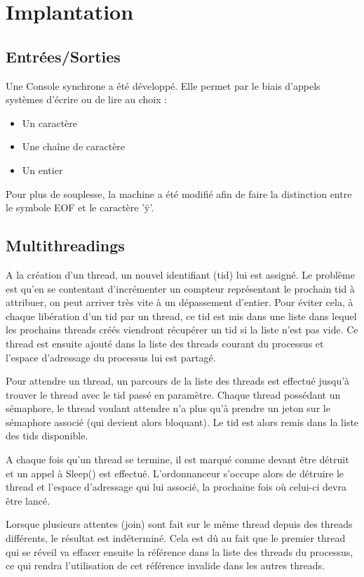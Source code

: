 \documentclass{report}
\begin{document}
\chapter{Implantation}
\section{Entrées/Sorties}
Une Console synchrone a été développé. Elle permet par le biais d'appels systèmes d'écrire ou de lire au choix : 

\begin{itemize}
\item Un caractère
\item Une chaîne de caractère
\item Un entier
\end{itemize}

Pour plus de souplesse, la machine a été modifié afin de faire la distinction entre le symbole EOF et le caractère 'ÿ'.

\section{Multithreadings}
A la création d'un thread, un nouvel identifiant (tid) lui est assigné. Le problème est qu'en se contentant d'incrémenter un compteur représentant le prochain tid à attribuer, on peut arriver très vite à un dépassement d'entier. Pour éviter cela, à chaque libération d'un tid par un thread, ce tid est mis dans une liste dans lequel les prochains threads créés viendront récupérer un tid si la liste n'est pas vide.
Ce thread est ensuite ajouté dans la liste des threads courant du processus et l'espace d'adressage du processus lui est partagé.

Pour attendre un thread, un parcours de la liste des threads est effectué jusqu'à trouver le thread avec le tid passé en paramètre. Chaque thread possédant un sémaphore, le thread voulant attendre n'a plus qu'à prendre un jeton sur le sémaphore associé (qui devient alors bloquant). Le tid est alors remis dans la liste des tids disponible.

A chaque fois qu'un thread se termine, il est marqué comme devant être détruit et un appel à Sleep() est effectué.
L'ordonnanceur s'occupe alors de détruire le thread et l'espace d'adressage qui lui associé, la prochaine fois où celui-ci devra être lancé.

Lorsque plusieurs attentes (join) sont fait sur le même thread depuis des threads différents, le résultat est indéterminé. Cela est dû au fait que le premier thread qui se réveil va effacer ensuite la référence dans la liste des threads du processus, ce qui rendra l'utilisation de cet référence invalide dans les autres threads.
\end{document}
